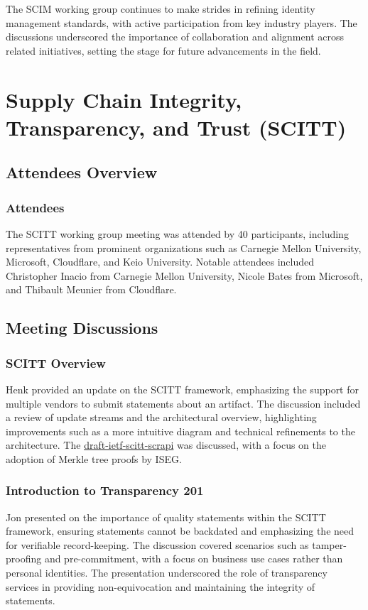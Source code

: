 \documentclass{article}
\begin{document}
The SCIM working group continues to make strides in refining identity management standards, with active participation from key industry players. The discussions underscored the importance of collaboration and alignment across related initiatives, setting the stage for future advancements in the field.



\newpage

\section{Supply Chain Integrity, Transparency, and Trust (SCITT)}

\subsection{Attendees Overview}
\subsubsection{Attendees}
The SCITT working group meeting was attended by 40 participants, including representatives from prominent organizations such as Carnegie Mellon University, Microsoft, Cloudflare, and Keio University. Notable attendees included Christopher Inacio from Carnegie Mellon University, Nicole Bates from Microsoft, and Thibault Meunier from Cloudflare.

\subsection{Meeting Discussions}

\subsubsection{SCITT Overview}
Henk provided an update on the SCITT framework, emphasizing the support for multiple vendors to submit statements about an artifact. The discussion included a review of update streams and the architectural overview, highlighting improvements such as a more intuitive diagram and technical refinements to the architecture. The \href{https://datatracker.ietf.org/doc/html/draft-ietf-scitt-scrapi}{draft-ietf-scitt-scrapi} was discussed, with a focus on the adoption of Merkle tree proofs by ISEG.

\subsubsection{Introduction to Transparency 201}
Jon presented on the importance of quality statements within the SCITT framework, ensuring statements cannot be backdated and emphasizing the need for verifiable record-keeping. The discussion covered scenarios such as tamper-proofing and pre-commitment, with a focus on business use cases rather than personal identities. The presentation underscored the role of transparency services in providing non-equivocation and maintaining the integrity of statements.
\end{document}
